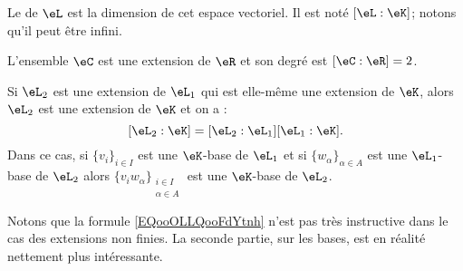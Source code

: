 \begin{definition}      \label{DefUYiyieu}
	Le  de \( \eL\) est la dimension de cet espace vectoriel. Il est noté \( [\eL:\eK]\); notons qu'il peut être infini.
\end{definition}

\begin{example}
	L'ensemble \( \eC\) est une extension de \( \eR\) et son degré est \( [\eC:\eR]=2\).
\end{example}

\begin{proposition}        \label{PROPooEGSJooBSocTf} \label{PropGWazMpY}
	Si \( \eL_2\) est une extension de \( \eL_1\) qui est elle-même une extension de \( \eK\), alors \( \eL_2\) est une extension de \( \eK\) et on a :
	\begin{equation}        \label{EQooOLLQooFdYtnh}
		[\eL_2:\eK]=[\eL_2:\eL_1][\eL_1:\eK].
	\end{equation}
	Dans ce cas, si \( \{ v_i \}_{i\in I}\) est une \( \eK\)-base de \( \eL_1\) et si \( \{ w_{\alpha} \}_{\alpha\in A}\) est une \( \eL_1\)-base de \( \eL_2\) alors \( \{ v_iw_{\alpha} \}_{\substack{i\in I\\\alpha\in A}}\) est une \( \eK\)-base de \( \eL_2\).
\end{proposition}

Notons que la formule \eqref{EQooOLLQooFdYtnh} n'est pas très instructive dans le cas des extensions non finies. La seconde partie, sur les bases, est en réalité nettement plus intéressante.

